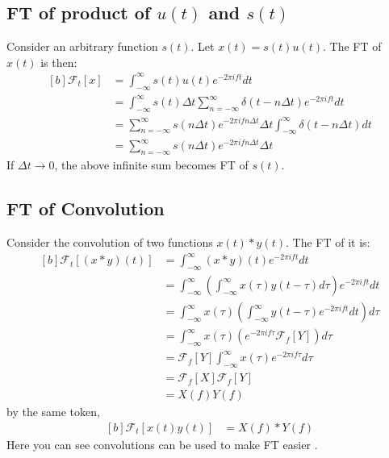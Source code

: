 \documentclass[letterpaper, 11pt]{article}
\newcommand{\fint}{\int_{-\infty}^{\infty}} %
\newcommand{\fsum}[1]{\sum_{#1 = -\infty}^{\infty}} %
\newcommand{\spf}[2]{\Delta #1 \fsum{#2} \delta (#1 - #2 \Delta #1)} %
\newcommand{\fourier}[2]{\mathcal{F}_{#1}[#2]} %
\newcommand{\ft}[3]{\fint #2 e^{-2\pi i#3#1} d#1} %
\newcommand{\conv}[4]{\fint #3(#2)#4(#1 - #2) d#2} %
\numberwithin{equation}{section}
\numberwithin{figure}{section}
\numberwithin{table}{section}
\begin{document}
\subsection{FT of product of \(u(t)\) and \(s(t)\)}\label{sec:su}
Consider an arbitrary function \(s(t)\). Let \(x(t) = s(t)u(t)\). The FT of \(x(t)\) is then:
\begin{equation}
	\begin{aligned}[b]
		\fourier{t}{x}
			&= \ft{t}{s(t)u(t)}{f}\\
			&= \ft{t}{s(t) \spf{t}{n}}{f}\\
			&= \fsum{n} s(n \Delta t) e^{-2\pi ifn\Delta t} \Delta t 
			   \fint \delta (t - n\Delta t) dt\\
			&= \fsum{n} s(n \Delta t) e^{-2\pi ifn\Delta t} \Delta t 
			\label{eq:ftsu}
	\end{aligned}
\end{equation}
If \(\Delta t \to 0\), the above infinite sum becomes FT of \(s(t)\). 

\subsection{FT of Convolution}
Consider the convolution of two functions \(x(t)*y(t)\). The FT of it is:
\begin{equation}
	\begin{aligned}[b]
		\fourier{t}{(x*y)(t)}
			&= \ft{t}{(x*y)(t)}{f}\\
			&= \ft{t}{\left (\conv{t}{\tau}{x}{y} \right )}{f}\\ 
			&= \fint x(\tau) \left (\fint y(t - \tau) e^{-2\pi ift} dt \right ) d\tau\\
			&= \fint x(\tau) \left ( e^{-2\pi if\tau}\fourier{f}{Y} \right )d\tau\\ 
			&= \fourier{f}{Y} \ft{\tau}{x(\tau)}{f}\\
			&= \fourier{f}{X} \fourier{f}{Y}\\
			&= X(f)Y(f)
	\end{aligned}
\end{equation}
by the same token,
\begin{equation}
	\begin{aligned}[b]
		\fourier{t}{x(t)y(t)}
			&= X(f)*Y(f)
			\label{eq:ftconv}
	\end{aligned}
\end{equation}
Here you can see convolutions can be used to make FT easier \cite{james}.
\end{document}
